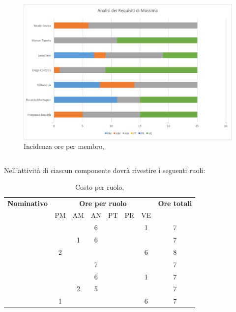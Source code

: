 \begin{figure}[H]
	\centering 
	\includegraphics[scale=0.55]{Immagini/GraficiPianoLavoro/ARM.png}
	\caption{Incidenza ore per membro, \ARM}
\end{figure}

\newpage
\subsection{\ARD}
Nell'attività di \ARD ciascun componente dovrà rivestire i seguenti ruoli:

\begin{table}[h]
	\begin{center}
		\begin{tabular}{|c|c|c|c|c|c|c|c|}
			\hline
			\textbf{Nominativo} & \multicolumn{6}{c|}{\textbf{Ore per ruolo}} & \textbf{Ore totali} \\
					& PM & AM & AN & PT & PR & VE & \\
			\hline
			\FB		& 	 &	  &	6  &	&	 & 1  &	7 \\
			\hline
			\RM		&	 & 1  &	6  &	&	 &	  &	7	\\
			\hline
			\SL		& 2	 &	  &	   &	&	 & 6  &	8	\\
			\hline
			\DC		&	 &	  &	7  &	&	 & 	  &	7	\\
			\hline
			\LD 	&	 &	  &	6  &	&	 & 1  &	7	\\
			\hline
			\MT		& 	 & 2  &	5  &	&	 &	  &	7	\\
			\hline
			\ND 	& 1	 &	  &	   &	&	 & 6  &	7	\\
			\hline
		\end{tabular}
	\end{center}
	\caption{Costo per ruolo, \ARD}
\end{table}

